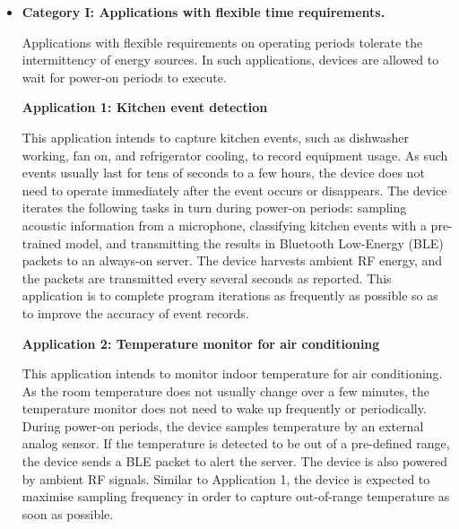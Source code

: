 \begin{itemize}

\item \textbf{Category I: Applications with flexible time requirements.}

Applications with flexible requirements on operating periods tolerate the intermittency of energy sources. In such applications, devices are allowed to wait for power-on periods to execute.

\textbf{Application 1: Kitchen event detection~\cite{maeng2019supporting}} 

This application intends to capture kitchen events, such as dishwasher working, fan on, and refrigerator cooling, to record equipment usage. 
As such events usually last for tens of seconds to a few hours, the device does not need to operate immediately after the event occurs or disappears. 
The device iterates the following tasks in turn during power-on periods: sampling acoustic information from a microphone, classifying kitchen events with a pre-trained model, and transmitting the results in Bluetooth Low-Energy (BLE) packets to an always-on server. 
The device harvests ambient RF energy, and the packets are transmitted every several seconds as reported. 
This application is to complete program iterations as frequently as possible so as to improve the accuracy of event records. 

\textbf{Application 2: Temperature monitor for air conditioning~\cite{colin2018reconfigurable}}

This application intends to monitor indoor temperature for air conditioning. 
As the room temperature does not usually change over a few minutes, the temperature monitor does not need to wake up frequently or periodically. 
During power-on periods, the device samples temperature by an external analog sensor. 
If the temperature is detected to be out of a pre-defined range, the device sends a BLE packet to alert the server. 
The device is also powered by ambient RF signals. 
Similar to Application 1, the device is expected to maximise sampling frequency in order to capture out-of-range temperature as soon as possible.


\end{itemize}
